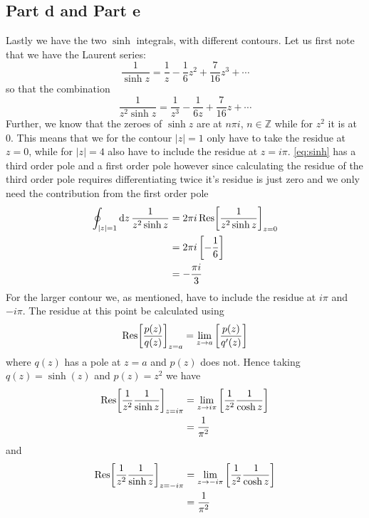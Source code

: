 \documentclass[a4paper,12pt]{article}
\begin{document}
\subsection*{Part d and Part e}
Lastly we have the two $\sinh$ integrals, with different contours. Let us first note that we have the Laurent series:
\begin{equation}
\frac{1}{\sinh z}=\frac{1}{z}-\frac{1}{6}z^2+\frac{7}{16}z^3+\cdots
\end{equation}
so that the combination
\begin{equation} \label{eq:sinh}
	\frac{1}{z^2\sinh z}=\frac{1}{z^3}-\frac{1}{6z}+\frac{7}{16}z+\cdots
\end{equation}
Further, we know that the zeroes of $\sinh z$ are at $n\pi i $, $n\in\mathds{Z}$ while for $z^2$ it is at $0$. This means that we for the contour $|z|=1$ only have to take the residue at $z=0$, while for $|z|=4$ also have to include the residue at $z=i\pi$. \eqref{eq:sinh} has a third order pole and a first order pole however since calculating the residue of the third order pole requires differentiating twice it's residue is just zero and we only need the contribution from the first order pole
\begin{equation}
\begin{aligned}
\oint_{|z|=1}\dd z\,\frac{1}{z^2\sinh z}  &=2\pi i \Res[\frac{1}{z^2\sinh z}]_{z=0}\\
&=2\pi i \left[-\frac{1}{6}\right]\\
&=-\frac{\pi i}{3}
\end{aligned}
\end{equation}
For the larger contour we, as mentioned, have to include the residue at $i\pi$ and $-i\pi$. The residue at this point be calculated using
\begin{equation}
\Res[\frac{p(z)}{q(z)}]_{z=a}=\lim_{z\to a}\left[\frac{p(z)}{q'(z)}\right]
\end{equation}
where $q(z)$ has a pole at $z=a$ and $p(z)$ does not. Hence taking $q(z)=\sinh(z)$ and $p(z)=z^2$  we have
\begin{equation}
\begin{aligned}
\Res[\frac{1}{z^2}\frac{1}{\sinh z}]_{z=i \pi}&=\lim_{z\to i\pi }\left[\frac{1}{z^2}\frac{1}{\cosh z}\right]\\
&=\frac{1}{\pi^2}
\end{aligned}
\end{equation}
and
\begin{equation}
	\begin{aligned}
		\Res[\frac{1}{z^2}\frac{1}{\sinh z}]_{z=-i \pi}&=\lim_{z\to -i\pi }\left[\frac{1}{z^2}\frac{1}{\cosh z}\right]\\
		&=\frac{1}{\pi^2}
	\end{aligned}
\end{equation}
\end{document}

